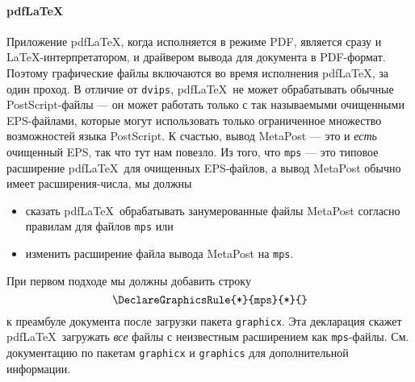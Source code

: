 \documentclass{article} %
\def\ttt{\texttt}  %
\begin{document}
\paragraph{pdf\LaTeX}
Приложение pdf\LaTeX, когда исполняется в режиме PDF, является сразу и 
\LaTeX-интерпретатором, и драйвером вывода для документа в PDF-формат.
Поэтому графические файлы включаются во время исполнения pdf\LaTeX, за 
один проход.
В отличие от \ttt{dvips}, pdf\LaTeX\ не может обрабатывать обычные 
PostScript-файлы  --- он может работать только с так называемыми очищенными 
EPS-файлами, которые могут использовать только 
ограниченное множество возможностей языка PostScript.
К счастью, вывод MetaPost --- это и \emph{есть} очищенный EPS, так что тут 
нам повезло. 
Из того, что \ttt{mps} --- это 
типовое расширение pdf\LaTeX\ для очищенных EPS-файлов, а вывод 
MetaPost обычно имеет расширения-числа, мы должны  
\begin{itemize}
\item сказать pdf\LaTeX\ обрабатывать занумерованные файлы MetaPost 
согласно правилам для файлов \ttt{mps} или
\item изменить расширение файла вывода MetaPost на \ttt{mps}.
\end{itemize}

При первом подходе мы должны добавить строку
$$ \verb+\DeclareGraphicsRule{*}{mps}{*}{}+ $$%
%
к преамбуле документа после загрузки пакета \ttt{graphicx}.
Эта декларация скажет pdf\LaTeX\ загружать \emph{все} файлы с 
неизвестным расширением как \ttt{mps}-файлы.
См. документацию по пакетам \ttt{graphicx} и \ttt{graphics} для 
дополнительной информации.
\end{document}
